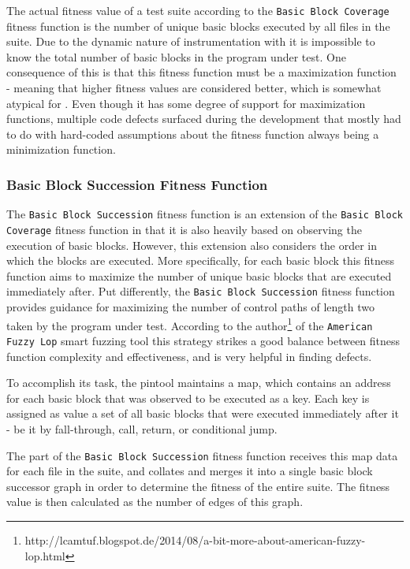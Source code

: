The actual fitness value of a test suite according to the \texttt{Basic Block Coverage} fitness function 
is the number of unique basic blocks executed by all \xml files in the suite. Due to the dynamic nature 
of instrumentation with \pin it is impossible to know the total number of basic blocks in the program 
under test. One consequence of this is that this fitness function must be a maximization function - meaning
that higher fitness values are considered better, which is somewhat atypical for \evosuite. Even though it has
some degree of support for maximization functions, multiple code defects surfaced during the development that
mostly had to do with hard-coded assumptions about the fitness function always being a minimization function.

\subsubsection{Basic Block Succession Fitness Function}
The \texttt{Basic Block Succession} fitness function is an extension of the \texttt{Basic Block Coverage}
fitness function in that it is also heavily based on observing the execution of basic blocks. However, this
extension also considers the order in which the blocks are executed. More specifically, for each basic block
this fitness function aims to maximize the number of unique basic blocks that are executed immediately after.
Put differently, the \texttt{Basic Block Succession} fitness function provides guidance for maximizing the
number of control paths of length two taken by the program under test. According to the
author\footnote{http://lcamtuf.blogspot.de/2014/08/a-bit-more-about-american-fuzzy-lop.html} of the
\texttt{American Fuzzy Lop} smart fuzzing tool\cite{afl} this strategy strikes a good balance between
fitness function complexity and effectiveness, and is very helpful in finding defects.

To accomplish its task, the pintool maintains a map, which contains an address for each basic block that was
observed to be executed as a key. Each key is assigned as value a set of all basic blocks that were executed
immediately after it - be it by fall-through, call, return, or conditional jump. 

The \java part of the \texttt{Basic Block Succession} fitness function receives this map data for each file in
the suite, and collates and merges it into a single basic block successor graph in order to determine the
fitness of the entire suite. The fitness value is then calculated as the number of edges of this graph. 

